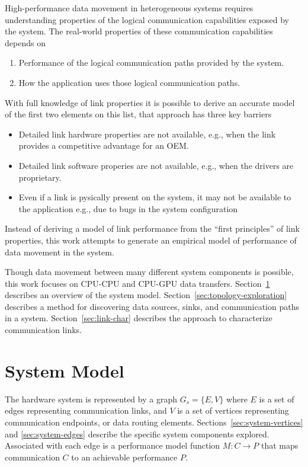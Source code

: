 High-performance data movement in heterogeneous systems requires understanding properties of the logical communication capabilities exposed by the system.
The real-world properties of these communication capabilities depends on 
\begin{enumerate}
    \item Performance of the logical communication paths provided by the system.
    \item How the application uses those logical communication paths.
\end{enumerate}

With full knowledge of link properties it is possible to derive an accurate model of the first two elements on this list, that approach has three key barriers
\begin{itemize}
    \item Detailed link hardware properties are not available, e.g., when the link provides a competitive advantage for an OEM.
    \item Detailed link software properies are not available, e.g., when the drivers are proprietary.
    \item Even if a link is pysically present on the system, it may not be available to the application {e.g., due to bugs in the system configuration}
\end{itemize}
Instead of deriving a model of link performance from the ``first principles'' of link properties, this work attempts to generate an empirical model of performance of data movement in the system.

Though data movement between many different system components is possible, this work focuses on CPU-CPU and CPU-GPU data transfers.
Section~\ref{sec:system-model} describes an overview of the system model.
Section~\ref{sec:topology-exploration} describes a method for discovering data sources, sinks, and communication paths in a system.
Section~\ref{sec:link-char} describes the approach to characterize communication links.

\section{System Model}
\label{sec:system-model}

The hardware system is represented by a graph $G_s = \{E,V\}$ where $E$ is a set of edges representing communication links, and $V$ is a set of vertices representing communication endpoints, or data routing elements.
Sections~\ref{sec:system-vertices} and \ref{sec:system-edges} describe the specific system components explored.
Associated with each edge is a performance model function $M: C \rightarrow P$ that maps communication $C$ to an achievable performance $P$.

